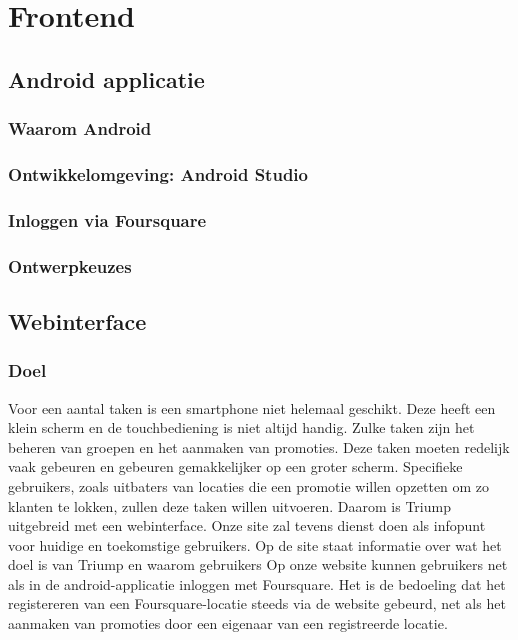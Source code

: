 \section{Frontend}
\subsection{Android applicatie}
\subsubsection{Waarom Android}
% 
\subsubsection{Ontwikkelomgeving: Android Studio}
\subsubsection{Inloggen via Foursquare}

\subsubsection{Ontwerpkeuzes}

\subsection{Webinterface}
\subsubsection{Doel}
Voor een aantal taken is een smartphone niet helemaal geschikt. Deze heeft een klein scherm en de touchbediening is niet altijd handig. Zulke taken zijn het beheren van groepen en het aanmaken van promoties.
Deze taken moeten redelijk vaak gebeuren en gebeuren gemakkelijker op een groter scherm. Specifieke gebruikers, zoals uitbaters van locaties die een promotie willen opzetten om zo klanten te lokken, zullen deze taken willen uitvoeren. Daarom is Triump uitgebreid met een webinterface.
Onze site zal tevens dienst doen als infopunt voor huidige en toekomstige gebruikers. Op de site staat informatie over wat het doel is van Triump en waarom gebruikers
Op onze website kunnen gebruikers net als in de android-applicatie inloggen met Foursquare. Het is de bedoeling dat het registereren van een Foursquare-locatie steeds via de website gebeurd, net als het aanmaken van promoties door een eigenaar van een registreerde locatie.

